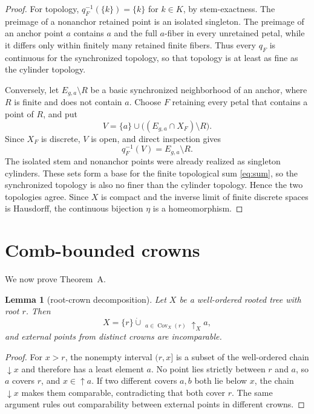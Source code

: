 \documentclass[11pt]{article}
\newtheorem{lemma}[theorem]{Lemma}
\theoremstyle{remark}
\numberwithin{equation}{section}
\begin{document}
\begin{proof}
For topology, $q_F^{-1}(\{k\})=\{k\}$ for $k\in K$, by stem-exactness. The
preimage of a nonanchor retained point is an isolated singleton. The preimage
of an anchor point $a$ contains $a$ and the full $a$-fiber in every unretained
petal, while it differs only within finitely many retained finite fibers. Thus
every $q_F$ is continuous for the synchronized topology, so that topology is
at least as fine as the cylinder topology.

Conversely, let $E_{g,a}\setminus R$ be a basic synchronized neighborhood of
an anchor, where $R$ is finite and does not contain $a$. Choose $F$ retaining
every petal that contains a point of $R$, and put
\begin{equation}
V=\{a\}\cup\bigl((E_{g,a}\cap X_F)\setminus R\bigr).
\label{eq:V}
\end{equation}
Since $X_F$ is discrete, $V$ is open, and direct inspection gives
\begin{equation}
q_F^{-1}(V)=E_{g,a}\setminus R.
\label{eq:cylinder}
\end{equation}
The isolated stem and nonanchor points were already realized as singleton
cylinders. These sets form a base for the finite topological sum
\eqref{eq:sum}, so the synchronized topology is also no finer than the cylinder
topology. Hence the two topologies agree. Since $X$ is compact and the inverse
limit of finite discrete spaces is Hausdorff, the continuous bijection $\eta$
is a homeomorphism.
\end{proof}

\section{Comb-bounded crowns}\label{sec:crowns}

We now prove Theorem~A.

\begin{lemma}[root-crown decomposition]\label{lem:decomposition}
Let $X$ be a well-ordered rooted tree with root $r$. Then
\begin{equation}
X=\{r\}\mathbin{\dot\cup}
\mathop{\dot\bigcup}_{a\in\operatorname{Cov}_X(r)}\uparrow_Xa,
\label{eq:decomposition}
\end{equation}
and external points from distinct crowns are incomparable.
\end{lemma}

\begin{proof}
For $x>r$, the nonempty interval $(r,x]$ is a subset of the well-ordered chain
$\downarrow x$ and therefore has a least element $a$. No point lies strictly
between $r$ and $a$, so $a$ covers $r$, and $x\in\uparrow a$. If two different
covers $a,b$ both lie below $x$, the chain $\downarrow x$ makes them
comparable, contradicting that both cover $r$. The same argument rules out
comparability between external points in different crowns.
\end{proof}
\end{document}
